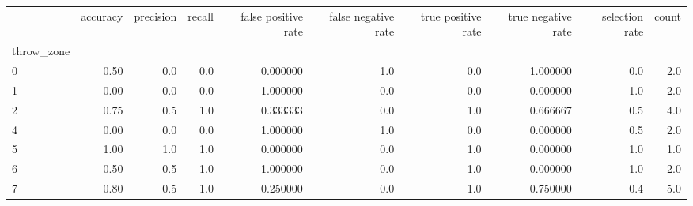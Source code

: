 \begin{tabular}{lrrrrrrrrr}
\toprule
{} &  accuracy &  precision &  recall &  false positive rate &  false negative rate &  true positive rate &  true negative rate &  selection rate &  count \\
throw\_zone &           &            &         &                      &                      &                     &                     &                 &        \\
\midrule
0          &      0.50 &        0.0 &     0.0 &             0.000000 &                  1.0 &                 0.0 &            1.000000 &             0.0 &    2.0 \\
1          &      0.00 &        0.0 &     0.0 &             1.000000 &                  0.0 &                 0.0 &            0.000000 &             1.0 &    2.0 \\
2          &      0.75 &        0.5 &     1.0 &             0.333333 &                  0.0 &                 1.0 &            0.666667 &             0.5 &    4.0 \\
4          &      0.00 &        0.0 &     0.0 &             1.000000 &                  1.0 &                 0.0 &            0.000000 &             0.5 &    2.0 \\
5          &      1.00 &        1.0 &     1.0 &             0.000000 &                  0.0 &                 1.0 &            0.000000 &             1.0 &    1.0 \\
6          &      0.50 &        0.5 &     1.0 &             1.000000 &                  0.0 &                 1.0 &            0.000000 &             1.0 &    2.0 \\
7          &      0.80 &        0.5 &     1.0 &             0.250000 &                  0.0 &                 1.0 &            0.750000 &             0.4 &    5.0 \\
\bottomrule
\end{tabular}
